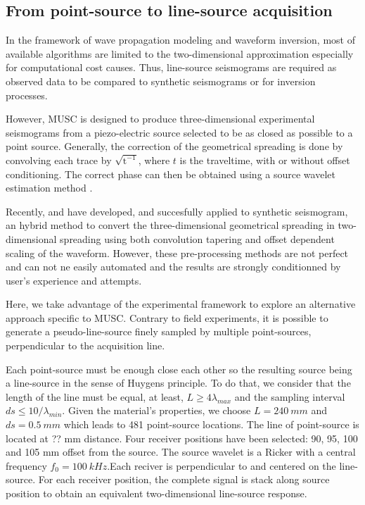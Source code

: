 \documentclass[manuscript,revised]{geophysics}
\begin{document}
\subsection{From point-source to line-source acquisition}

\noindent In the framework of wave propagation modeling and waveform inversion, most of available algorithms are limited to the two-dimensional approximation especially for computational cost causes. Thus, line-source seismograms are required as observed data to be compared to synthetic seismograms or for inversion processes.

\noindent However, MUSC is designed to produce three-dimensional experimental seismograms from a piezo-electric source selected to be as closed as possible to a point source. Generally, the correction of the geometrical spreading is done by convolving each trace by $\mathrm{\sqrt{t^{-1}}}$, where $t$ is the traveltime, with or without offset conditioning. The correct phase can then be obtained using a source wavelet estimation method \citep{Bretaudeau_SSM_2011}.

\noindent Recently, \citet{Forbriger_LSS_2014} and \citet{Schafer_LSS_2014} have developed, and succesfully applied to synthetic seismogram, an hybrid method to convert the three-dimensional geometrical spreading in two-dimensional spreading using both convolution tapering and offset dependent scaling of the waveform. However, these pre-processing methods are not perfect and can not ne easily automated and the results are strongly conditionned by user's experience and attempts.

\noindent Here, we take advantage of the experimental framework to explore an alternative approach specific to MUSC. Contrary to field experiments, it is possible to generate a pseudo-line-source finely sampled by multiple point-sources, perpendicular to the acquisition line. 

\noindent Each point-source must be enough close each other so the resulting source being a line-source in the sense of Huygens principle. To do that, we consider that the length of the line must be equal, at least, $L \geq 4\lambda_{max}$ and the sampling interval $ds \leq 10 / \lambda_{min}$. Given the material's properties, we choose $L=240\ mm$ and $ds=0.5\ mm$ which leads to 481 point-source locations. The line of point-source is located at ?? mm distance. Four receiver positions have been selected: 90, 95, 100 and 105 mm offset from the source. The source wavelet is a Ricker with a central frequency $f_{0}=100\ kHz$.Each reciver is perpendicular to and centered on the line-source. For each receiver position, the complete signal is stack along source position to obtain an equivalent two-dimensional line-source response.
 
\end{document}
